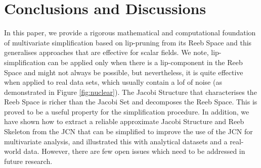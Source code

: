 \documentclass[twocolumn]{article}
\newcommand{\figref}[1]{Figure \ref{fig:#1}}
\begin{document}
\section{Conclusions and Discussions}
\label{sec:Conclusions}
In this paper, we provide a rigorous mathematical and computational foundation of
multivariate simplification based on lip-pruning from its Reeb Space 
and this generalises approaches that are effective for scalar fields.
We note, lip-simplification can be applied only when there is a
lip-component in the Reeb Space and might not always be possible, but
nevertheless, it is quite effective when applied to real data sets,
which usually contain a lof of noise (as demonstrated in
\figref{nuclear}). The Jacobi Structure
that characterises the Reeb Space is richer than the Jacobi
Set and decomposes the Reeb Space. This is proved to be a useful
property for the simplification procedure.
In addition, we have shown how to extract a reliable
approximate Jacobi Structure and Reeb Skeleton from the JCN that can be simplified to 
improve the use of the JCN for multivariate analysis, and illustrated this with analytical
datasets and a real-world data. However, there are few open issues which
need to be addressed in future research.
\end{document}
